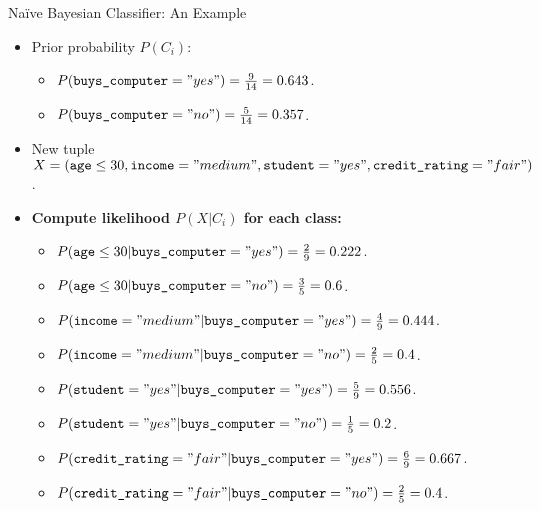 \begin{frame}{Naïve Bayesian Classifier: An Example}
	\begin{itemize}
		\item Prior probability $P(C_i)$:
		      \begin{itemize}
			      \item $P(\texttt{buys\_computer} = "yes") = \frac{9}{14} = 0.643$.
			      \item $P(\texttt{buys\_computer} = "no") = \frac{5}{14} = 0.357$.
		      \end{itemize}
		\item New tuple $X = (\texttt{age} \leq 30 , \texttt{income} = "medium", \texttt{student} = "yes", \texttt{credit\_rating} = "fair")$.
		\item \textbf{Compute likelihood $P(X|C_i)$ for each class:}
		      \begin{itemize}
			      \item $P(\texttt{age} \leq 30 | \texttt{buys\_computer} = "yes") = \frac{2}{9} = 0.222$.
			      \item $P(\texttt{age} \leq 30 | \texttt{buys\_computer} = "no") = \frac{3}{5} = 0.6$.
			      \item $P(\texttt{income} = "medium" | \texttt{buys\_computer} = "yes") = \frac{4}{9} = 0.444$.
			      \item $P(\texttt{income} = "medium" | \texttt{buys\_computer} = "no") = \frac{2}{5} = 0.4$.
			      \item $P(\texttt{student} = "yes" | \texttt{buys\_computer} = "yes") = \frac{5}{9} = 0.556$.
			      \item $P(\texttt{student} = "yes" | \texttt{buys\_computer} = "no") = \frac{1}{5} = 0.2$.
			      \item $P(\texttt{credit\_rating} = "fair" | \texttt{buys\_computer} = "yes") = \frac{6}{9} = 0.667$.
			      \item $P(\texttt{credit\_rating} = "fair" | \texttt{buys\_computer} = "no") = \frac{2}{5} = 0.4$.
		      \end{itemize}
	\end{itemize}
\end{frame}


